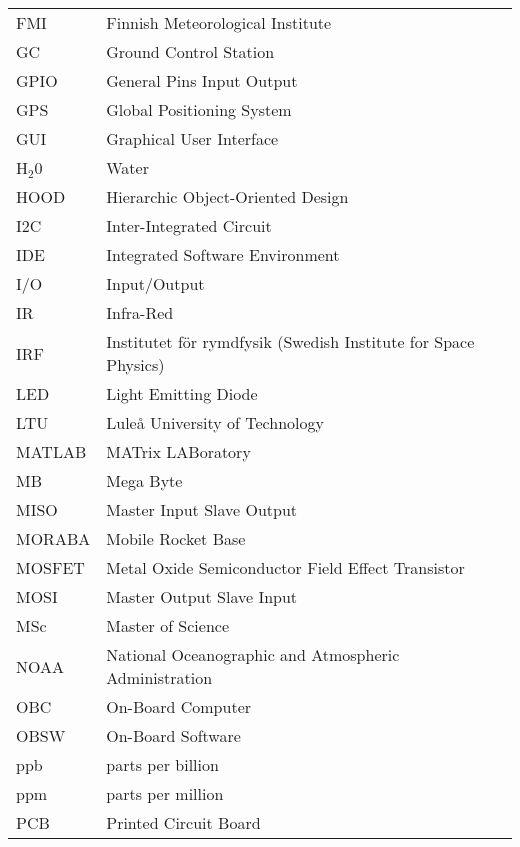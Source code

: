 \begin{longtable}{p{3cm} p{9cm}}
             FMI         & Finnish Meteorological Institute\\
             GC          & Ground Control Station\\
             GPIO        & General Pins Input Output\\
             GPS         & Global Positioning System\\
             GUI         & Graphical User Interface\\
             H$_2$0      & Water \\
             HOOD        & Hierarchic Object-Oriented Design\\
             I2C         & Inter-Integrated Circuit \\
             IDE         & Integrated Software Environment \\
             I/O         & Input/Output\\
             IR          & Infra-Red\\
             IRF         & Institutet för rymdfysik (Swedish Institute for Space Physics)\\
             LED         & Light Emitting Diode\\
             LTU         & Luleå University of Technology \\
             MATLAB      & MATrix LABoratory\\
             MB          & Mega Byte\\
             MISO        & Master Input Slave Output\\
             MORABA      & Mobile Rocket Base \\
             MOSFET      & Metal Oxide Semiconductor Field Effect Transistor\\
             MOSI        & Master Output Slave Input\\
             MSc         & Master of Science \\
             NOAA        & National Oceanographic and Atmospheric Administration \\
             OBC         & On-Board Computer\\
             OBSW        & On-Board Software\\
             ppb         & parts per billion\\
             ppm         & parts per million\\
             PCB         & Printed Circuit Board\\

\end{longtable}
